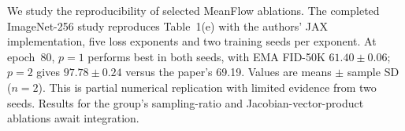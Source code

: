 We study the reproducibility of selected MeanFlow ablations. The completed ImageNet-256 study reproduces Table~1(e) with the authors' JAX implementation, five loss exponents and two training seeds per exponent. At epoch~80, $p=1$ performs best in both seeds, with EMA FID-50K $61.40\pm0.06$; $p=2$ gives $97.78\pm0.24$ versus the paper's 69.19. Values are means $\pm$ sample SD ($n=2$). This is partial numerical replication with limited evidence from two seeds. Results for the group's sampling-ratio and Jacobian-vector-product ablations await integration.
